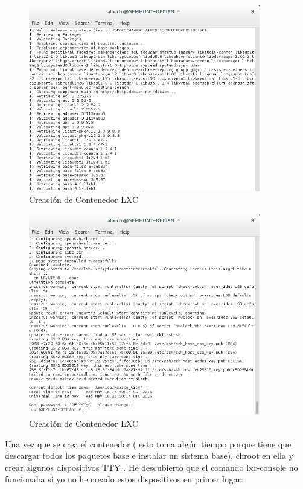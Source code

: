 \documentclass[1pt]{article} %
\begin{document}
\begin{center}
\end{center}
\begin{figure}[!ht]
	\begin{center}
		\includegraphics[width=0.9\textwidth]{8.png}
		\caption{Creación de Contenedor LXC}
	\end{center}
\end{figure}
\newpage
\begin{figure}[!ht]
	\begin{center}
		\includegraphics[width=0.9\textwidth]{11.png}
		\caption{Creación de Contenedor LXC}
	\end{center}
\end{figure}
Una vez que se crea el contenedor ( esto toma algún tiempo porque tiene que descargar todos los paquetes base e instalar un sistema base), chroot en ella y crear algunos dispositivos TTY . He descubierto que el comando lxc-console no funcionaba si yo no he creado estos dispositivos en primer lugar:
\end{document}
